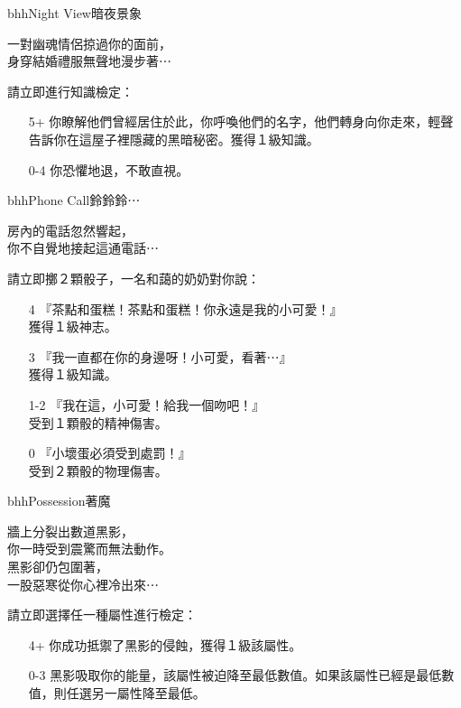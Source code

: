 \linebreak[0]%
\begin{EventCard}{bhh}{Night View}{暗夜景象}
  \begin{CardStory}
    一對幽魂情侶掠過你的面前，\\
    身穿結婚禮服無聲地漫步著⋯
  \end{CardStory}
  請立即進行知識檢定：
  \begin{itemize}
    \item[5+] 你瞭解他們曾經居住於此，你呼喚他們的名字，他們轉身向你走來，輕聲告訴你在這屋子裡隱藏的黑暗秘密。獲得１級知識。
    \item[0-4] 你恐懼地退，不敢直視。
  \end{itemize}
\end{EventCard}%
\linebreak[0]%
\begin{EventCard}{bhh}{Phone Call}{鈴鈴鈴⋯}
  \begin{CardStory}
    房內的電話忽然響起，\\
    你不自覺地接起這通電話⋯
  \end{CardStory}
  請立即擲２顆骰子，一名和藹的奶奶對你說：
  \begin{itemize}
    \item[4] 『茶點和蛋糕！茶點和蛋糕！你永遠是我的小可愛！』\\
獲得１級神志。
    \item[3] 『我一直都在你的身邊呀！小可愛，看著⋯』\\
獲得１級知識。
    \item[1-2] 『我在這，小可愛！給我一個吻吧！』\\
受到１顆骰的精神傷害。
    \item[0] 『小壞蛋必須受到處罰！』\\
受到２顆骰的物理傷害。
  \end{itemize}
\end{EventCard}%
\linebreak[0]%
\begin{EventCard}{bhh}{Possession}{著魔}
  \begin{CardStory}
    牆上分裂出數道黑影，\\
    你一時受到震驚而無法動作。\\
    黑影卻仍包圍著，\\
    一股惡寒從你心裡冷出來⋯
  \end{CardStory}
  請立即選擇任一種屬性進行檢定：
  \begin{itemize}
    \item[4+] 你成功抵禦了黑影的侵蝕，獲得１級該屬性。
    \item[0-3] 黑影吸取你的能量，該屬性被迫降至最低數值。如果該屬性已經是最低數值，則任選另一屬性降至最低。
  \end{itemize}
\end{EventCard}%
